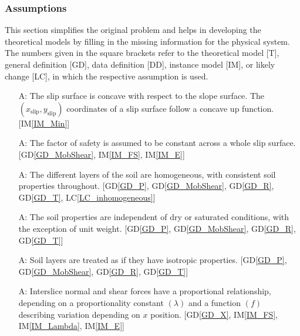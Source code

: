 \documentclass[12pt]{article}
\newcounter{assumpnum} %
\newcommand{\iref}[1]{IM\ref{#1}}
\newcommand{\dref}[1]{GD\ref{#1}}
\newcommand{\lcref}[1]{LC\ref{#1}}
\begin{document}
\subsubsection{Assumptions}
\label{Assumptions}
This section simplifies the original problem and helps in developing the
theoretical models by filling in the missing information for the physical
system. The numbers given in the square brackets refer to the theoretical model
[T], general definition [GD], data definition [DD], instance model [IM], or
likely change [LC], in which the respective assumption is used.

\begin{enumerate}[label=A\arabic*:,ref={\arabic*}]
\item [A\refstepcounter{assumpnum}\theassumpnum: \label{A_Concave}] The
  slip surface is concave with respect to the slope surface. The 
  $(x_{\text{slip}},y_{\text{slip}})$ coordinates of a slip surface follow a 
  concave up 
  function. [\iref{IM_Min}]

\item [A\refstepcounter{assumpnum}\theassumpnum: \label{A_Constant}] The factor 
of safety is assumed to be constant across a whole slip surface. 
[\dref{GD_MobShear}, \iref{IM_FS}, \iref{IM_E}]

\item [A\refstepcounter{assumpnum}\theassumpnum: \label{A_Homo}] The
  different layers of the soil are homogeneous, with consistent soil
  properties throughout. [\dref{GD_P}, \dref{GD_MobShear}, \dref{GD_R}, 
  \dref{GD_T}, \lcref{LC_inhomogeneous}]
  
\item [A\refstepcounter{assumpnum}\theassumpnum: \label{A_Saturated}] The soil 
properties are independent of dry or saturated conditions, with the exception 
of unit weight. [\dref{GD_P}, \dref{GD_MobShear}, \dref{GD_R}, 
\dref{GD_T}]

\item [A\refstepcounter{assumpnum}\theassumpnum: \label{A_Isotropic}]
  Soil layers are treated as if they have isotropic properties. [\dref{GD_P}, 
  \dref{GD_MobShear}, \dref{GD_R}, \dref{GD_T}]
  
\item [A\refstepcounter{assumpnum}\theassumpnum: \label{A_Base}]
  Interslice normal and shear forces have a proportional relationship,
  depending on a proportionality constant $\left({\lambda}\right)$ and a
  function $\left({f}\right)$ describing variation depending on $x$
  position. [\dref{GD_X}, \iref{IM_FS}, \iref{IM_Lambda}, \iref{IM_E}]
  

\end{enumerate}
\end{document}
